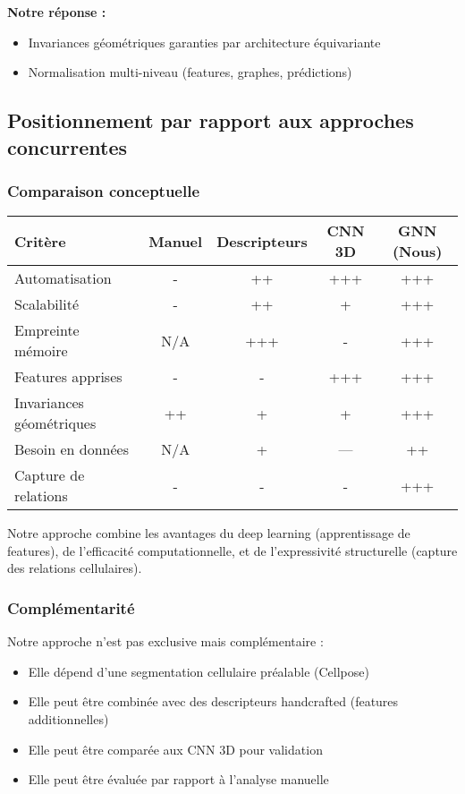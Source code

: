 \textbf{Notre réponse :}
\begin{itemize}
    \item Invariances géométriques garanties par architecture équivariante
    \item Normalisation multi-niveau (features, graphes, prédictions)
\end{itemize}

\subsection{Positionnement par rapport aux approches concurrentes}

\subsubsection{Comparaison conceptuelle}

\begin{center}
\begin{tabular}{|l|c|c|c|c|}
\hline
\textbf{Critère} & \textbf{Manuel} & \textbf{Descripteurs} & \textbf{CNN 3D} & \textbf{GNN (Nous)} \\
\hline
Automatisation & - & ++ & +++ & +++ \\
Scalabilité & - & ++ & + & +++ \\
Empreinte mémoire & N/A & +++ & - & +++ \\
Features apprises & - & - & +++ & +++ \\
Invariances géométriques & ++ & + & + & +++ \\
Besoin en données & N/A & + & --- & ++ \\
Capture de relations & - & - & - & +++ \\
\hline
\end{tabular}
\end{center}

Notre approche combine les avantages du deep learning (apprentissage de features), de l'efficacité computationnelle, et de l'expressivité structurelle (capture des relations cellulaires).

\subsubsection{Complémentarité}

Notre approche n'est pas exclusive mais complémentaire :
\begin{itemize}
    \item Elle dépend d'une segmentation cellulaire préalable (Cellpose)
    \item Elle peut être combinée avec des descripteurs handcrafted (features additionnelles)
    \item Elle peut être comparée aux CNN 3D pour validation
    \item Elle peut être évaluée par rapport à l'analyse manuelle
\end{itemize}

